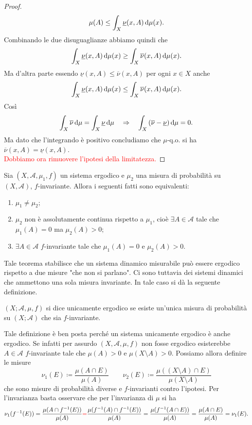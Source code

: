 \begin{proof}
    \[
        \mu(A) \leq \int_{X}\underline{\nu}(x, A) \dif{\mu}(x).
    \]
    Combinando le due disuguaglianze abbiamo quindi che
    \[
        \int_{X}\underline{\nu}(x, A) \dif{\mu}(x) \geq \int_{X}\overline{\nu}(x, A) \dif{\mu}(x).
    \]
    Ma d'altra parte essendo $ \underline{\nu}(x, A) \leq \overline{\nu}(x, A) $ per ogni $ x \in X $ anche
    \[
        \int_{X}\underline{\nu}(x, A) \dif{\mu}(x) \leq \int_{X}\overline{\nu}(x, A) \dif{\mu}(x).
    \]
    Così
    \[
        \int_{X} \overline{\nu} \dif{\mu} = \int_{X} \underline{\nu} \dif{\mu} \quad \Rightarrow \quad \int_{X} \left(\overline{\nu} - \underline{\nu}\right) \dif{\mu} = 0.
    \]
    Ma dato che l'integrando è positivo concludiamo che $ \mu $-q.o. si ha $ \overline{\nu}(x, A) = \underline{\nu}(x, A) $. \\
    \textcolor{red}{Dobbiamo ora rimuovere l'ipotesi della limitatezza.}
\end{proof}

\begin{proposition}
    Sia $ (X, \mathcal{A}, \mu_1, f) $ un sistema ergodico e $ \mu_2 $ una misura di probabilità su $ (X, \mathcal{A}) $, $ f $-invariante. Allora i seguenti fatti sono equivalenti:
    \begin{enumerate}[label=(\roman*)]
        \item $ \mu_1 \neq \mu_2 $;
        \item $ \mu_2 $ non è assolutamente continua rispetto a $ \mu_1 $, cioè $ \exists A \in \mathcal{A} $ tale che $ \mu_1(A) = 0 $ ma $ \mu_2(A) > 0 $;
        \item $ \exists A \in \mathcal{A} $ $ f $-invariante tale che $ \mu_1(A) = 0 $ e $ \mu_2(A) > 0 $.
    \end{enumerate}
\end{proposition}

Tale teorema stabilisce che un sistema dinamico misurabile può essere ergodico rispetto a due misure "che non si parlano". Ci sono tuttavia dei sistemi dinamici che ammettono una sola misura invariante. In tale caso si dà la seguente definizione.

\begin{definition}
    $ (X; \mathcal{A}, \mu, f) $ si dice unicamente ergodico se esiste un'unica misura di probabilità su $ (X; \mathcal{A}) $ che sia $ f $-invariante.
\end{definition}

Tale definizione è ben posta perché un sistema unicamente ergodico è anche ergodico. Se infatti per assurdo $ (X, \mathcal{A}, \mu, f) $ non fosse ergodico esisterebbe $ A \in \mathcal{A} $ $ f $-invariante tale che $ \mu(A) > 0 $ e $ \mu(X \setminus A) > 0 $. Possiamo allora definire le misure
\[
     \nu_1(E) \coloneqq \frac{\mu(A \cap E)}{\mu(A)}
     \qquad
     \nu_2(E) \coloneqq \frac{\mu((X \setminus A) \cap E)}{\mu(X \setminus A)}
\]
che sono misure di probabilità diverse e $ f $-invarianti contro l'ipotesi. Per l'invarianza basta osservare che per l'invarianza di $ \mu $ si ha
\[
    \nu_1(f^{-1}(E)) = \frac{\mu(A \cap f^{-1}(E))}{\mu(A)} \textcolor{red}{=} \frac{\mu(f^{-1}(A) \cap f^{-1}(E))}{\mu(A)} = \frac{\mu(f^{-1}(A \cap E))}{\mu(A)} = \frac{\mu(A \cap E)}{\mu(A)} = \nu_1(E).
\]

